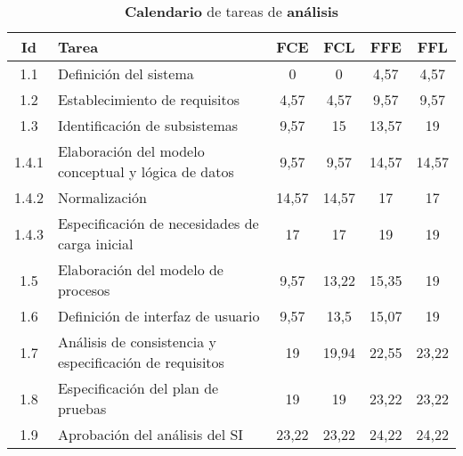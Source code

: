 \documentclass[11pt,a4paper,spanish,twoside]{report}
\begin{document}
\begin{table}[!h]
  \centering
  \begin{tabular}{|c||p{5.3cm}||c|c|c|c|}
    \hline
    \textbf{Id} & \textbf{Tarea} & \textbf{FCE} & \textbf{FCL} &
    \textbf{FFE} & \textbf{FFL}\\
    \hline \hline
    1.1 & Definición del sistema & 0 & 0 & 4,57 & 4,57 \\
    \hline
    1.2 & Establecimiento de requisitos & 4,57 & 4,57 & 9,57  & 9,57 \\
    \hline
    1.3 & Identificación de subsistemas  & 9,57 & 15 & 13,57 & 19 \\
    \hline
    1.4.1 & Elaboración del modelo conceptual y lógica de datos & 9,57 &
    9,57 & 14,57 & 14,57 \\
    \hline
    1.4.2 & Normalización  & 14,57 & 14,57 & 17 & 17 \\
    \hline
    1.4.3 & Especificación de necesidades de carga inicial  & 17 & 17 & 19
    & 19 \\ 
    \hline
    1.5 & Elaboración del modelo de procesos & 9,57  & 13,22 & 15,35 & 19 \\
    \hline
    1.6 & Definición de interfaz de usuario  & 9,57 & 13,5 & 15,07 & 19 \\
    \hline
    1.7 & Análisis de consistencia y especificación de requisitos & 19 &
    19,94 & 22,55 & 23,22\\ 
    \hline
    1.8 & Especificación del plan de pruebas & 19 & 19 & 23,22 & 23,22\\
    \hline
    1.9 & Aprobación del análisis del SI & 23,22 & 23,22 & 24,22 & 24,22 \\
    \hline
  \end{tabular}
  \caption{\textbf{Calendario} de tareas de \textbf{análisis}}
  \label{Tab:CALana}
\end{table}
    
\end{document}
